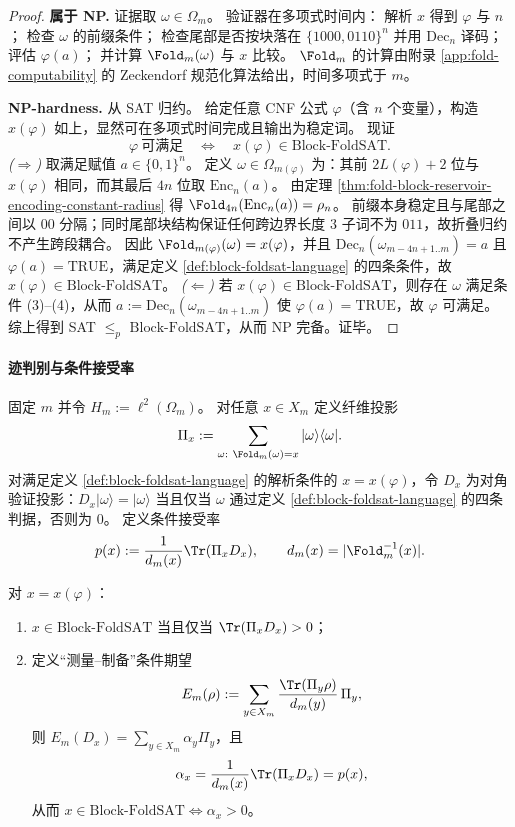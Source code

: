 \begin{proof}
\textbf{属于 NP.}
证据取 \(\omega\in\Omega_m\)。
验证器在多项式时间内：
解析 \(x\) 得到 \(\varphi\) 与 \(n\)；
检查 \(\omega\) 的前缀条件；
检查尾部是否按块落在 \(\{1000,0110\}^n\) 并用 \(\mathrm{Dec}_n\) 译码；
评估 \(\varphi(a)\)；
并计算 \(\Fold_m(\omega)\) 与 \(x\) 比较。
\(\Fold_m\) 的计算由附录 \ref{app:fold-computability} 的 Zeckendorf 规范化算法给出，时间多项式于 \(m\)。
\par
\textbf{NP-hardness.}
从 SAT 归约。
给定任意 CNF 公式 \(\varphi\)（含 \(n\) 个变量），构造 \(x(\varphi)\) 如上，显然可在多项式时间完成且输出为稳定词。
现证
\[
\varphi\ \text{可满足}
\quad\Longleftrightarrow\quad
x(\varphi)\in \mathrm{Block}\text{-}\mathrm{FoldSAT}.
\]
\emph{(\(\Rightarrow\))}
取满足赋值 \(a\in\{0,1\}^n\)。
定义 \(\omega\in\Omega_{m(\varphi)}\) 为：其前 \(2L(\varphi)+2\) 位与 \(x(\varphi)\) 相同，而其最后 \(4n\) 位取 \(\mathrm{Enc}_n(a)\)。
由定理 \ref{thm:fold-block-reservoir-encoding-constant-radius} 得 \(\Fold_{4n}(\mathrm{Enc}_n(a))=\rho_n\)。
前缀本身稳定且与尾部之间以 \(00\) 分隔；同时尾部块结构保证任何跨边界长度 \(3\) 子词不为 \(011\)，故折叠归约不产生跨段耦合。
因此 \(\Fold_{m(\varphi)}(\omega)=x(\varphi)\)，并且 \(\mathrm{Dec}_n(\omega_{m-4n+1..m})=a\) 且 \(\varphi(a)=\mathrm{TRUE}\)，满足定义 \ref{def:block-foldsat-language} 的四条条件，故 \(x(\varphi)\in \mathrm{Block}\text{-}\mathrm{FoldSAT}\)。
\emph{(\(\Leftarrow\))}
若 \(x(\varphi)\in \mathrm{Block}\text{-}\mathrm{FoldSAT}\)，则存在 \(\omega\) 满足条件 (3)--(4)，从而 \(a:=\mathrm{Dec}_n(\omega_{m-4n+1..m})\) 使 \(\varphi(a)=\mathrm{TRUE}\)，故 \(\varphi\) 可满足。
综上得到 SAT \(\le_p\) \(\mathrm{Block}\text{-}\mathrm{FoldSAT}\)，从而 NP 完备。证毕。
\end{proof}

\paragraph{迹判别与条件接受率}
固定 \(m\) 并令 \(H_m:=\ell^2(\Omega_m)\)。
对任意 \(x\in X_m\) 定义纤维投影
\[
\Pi_x:=\sum_{\omega:\ \Fold_m(\omega)=x}|\omega\rangle\langle\omega|.
\]
对满足定义 \ref{def:block-foldsat-language} 的解析条件的 \(x=x(\varphi)\)，令 \(D_x\) 为对角验证投影：\(D_x|\omega\rangle=|\omega\rangle\) 当且仅当 \(\omega\) 通过定义 \ref{def:block-foldsat-language} 的四条判据，否则为 \(0\)。
定义条件接受率
\[
p(x):=\frac{1}{d_m(x)}\Tr(\Pi_xD_x),
\qquad d_m(x)=|\Fold_m^{-1}(x)|.
\]

\begin{proposition}[迹判别与中心系数非零性]\label{prop:block-foldsat-trace-criterion}
对 \(x=x(\varphi)\)：
\begin{enumerate}
  \item \(x\in\mathrm{Block}\text{-}\mathrm{FoldSAT}\) 当且仅当 \(\Tr(\Pi_xD_x)>0\)；
  \item 定义“测量--制备”条件期望
  \[
  E_m(\rho):=\sum_{y\in X_m}\frac{\Tr(\Pi_y\rho)}{d_m(y)}\,\Pi_y,
  \]
  则 \(E_m(D_x)=\sum_{y\in X_m}\alpha_y\Pi_y\)，且
  \[
  \alpha_x=\frac{1}{d_m(x)}\Tr(\Pi_xD_x)=p(x),
  \]
  从而 \(x\in\mathrm{Block}\text{-}\mathrm{FoldSAT}\iff \alpha_x>0\)。
\end{enumerate}
\end{proposition}

